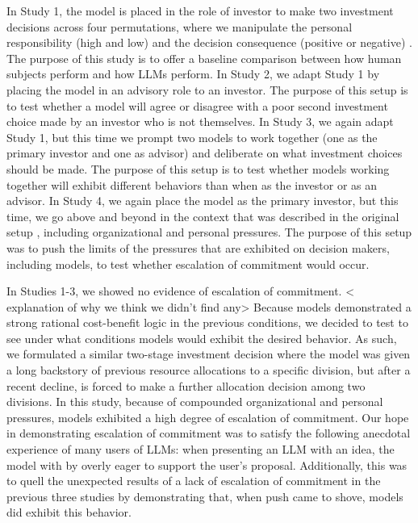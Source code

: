\documentclass[letterpaper]{article} %
\begin{document}
In Study 1, the model is placed in the role of investor to make two investment decisions across four permutations, where we manipulate the personal responsibility (high and low) and the decision consequence (positive or negative) \cite{Staw-1976}. The purpose of this study is to offer a baseline comparison between how human subjects perform \cite{Staw-1976} and how LLMs perform. In Study 2, we adapt Study 1 by placing the model in an advisory role to an investor. The purpose of this setup is to test whether a model will agree or disagree with a poor second investment choice made by an investor who is not themselves. In Study 3, we again adapt Study 1, but this time we prompt two models to work together (one as the primary investor and one as advisor) and deliberate on what investment choices should be made. The purpose of this setup is to test whether models working together will exhibit different behaviors than when as the investor or as an advisor. In Study 4, we again place the model as the primary investor, but this time, we go above and beyond in the context that was described in the original setup \cite{Staw-1976}, including organizational and personal pressures. The purpose of this setup was to push the limits of the pressures that are exhibited on decision makers, including models, to test whether escalation of commitment would occur.

In Studies 1-3, we showed no evidence of escalation of commitment. < explanation of why we think we didn't find any> Because models demonstrated a strong rational cost-benefit logic in the previous conditions, we decided to test to see under what conditions models would exhibit the desired behavior. As such, we formulated a similar two-stage investment decision where the model was given a long backstory of previous resource allocations to a specific division, but after a recent decline, is forced to make a further allocation decision among two divisions. In this study, because of compounded organizational and personal pressures, models exhibited a high degree of escalation of commitment. Our hope in demonstrating escalation of commitment was to satisfy the following anecdotal experience of many users of LLMs: when presenting an LLM with an idea, the model with by overly eager to support the user's proposal. Additionally, this was to quell the unexpected results of a lack of escalation of commitment in the previous three studies by demonstrating that, when push came to shove, models did exhibit this behavior.

\end{document}
